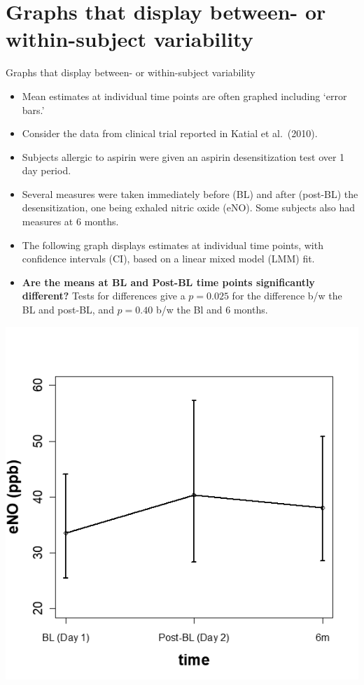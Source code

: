 \documentclass[
  9pt,
  ignorenonframetext,
]{beamer}
\providecommand{\tightlist}{%
  \setlength{\itemsep}{0pt}\setlength{\parskip}{0pt}}
\begin{document}
\hypertarget{graphs-that-display-between--or-within-subject-variability}{%
\section{Graphs that display between- or within-subject
variability}\label{graphs-that-display-between--or-within-subject-variability}}

\begin{frame}{Graphs that display between- or within-subject
variability}
\begin{itemize}
\tightlist
\item
  Mean estimates at individual time points are often graphed including
  `error bars.'
\item
  Consider the data from clinical trial reported in Katial et
  al.~(2010).\\
\item
  Subjects allergic to aspirin were given an aspirin desensitization
  test over 1 day period.\\
\item
  Several measures were taken immediately before (BL) and after
  (post-BL) the desensitization, one being exhaled nitric oxide (eNO).
  Some subjects also had measures at 6 months.
\item
  The following graph displays estimates at individual time points, with
  confidence intervals (CI), based on a linear mixed model (LMM) fit.\\
\item
  \textbf{Are the means at BL and Post-BL time points significantly
  different?} Tests for differences give a \(p=0.025\) for the
  difference b/w the BL and post-BL, and \(p=0.40\) b/w the Bl and 6
  months.\\
  \tiny
\end{itemize}

\begin{center}\includegraphics[width=0.32\linewidth]{figs_L2/L2-f8} \end{center}

\tiny
\end{frame}
\end{document}
